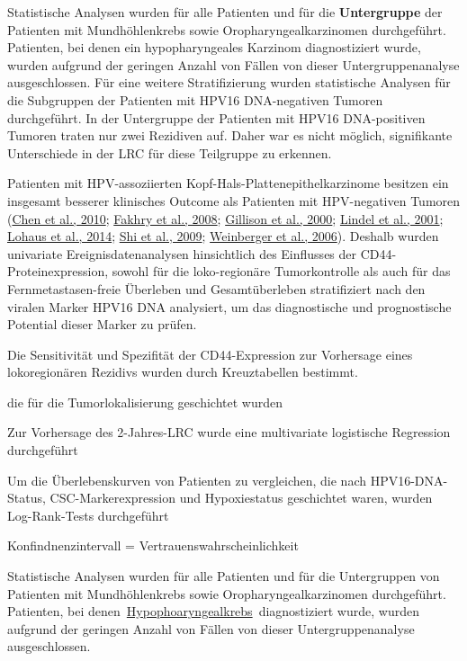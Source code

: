 Statistische Analysen wurden für alle Patienten und für die \textbf{Untergruppe} der Patienten mit Mundhöhlenkrebs sowie Oropharyngealkarzinomen durchgeführt. Patienten, bei denen ein hypopharyngeales Karzinom diagnostiziert wurde, wurden aufgrund der geringen Anzahl von Fällen von dieser Untergruppenanalyse ausgeschlossen. Für eine weitere Stratifizierung wurden statistische Analysen für die Subgruppen der Patienten mit HPV16 DNA-negativen Tumoren durchgeführt. In der Untergruppe der Patienten mit HPV16 DNA-positiven Tumoren traten nur zwei Rezidiven auf. Daher war es nicht möglich, signifikante Unterschiede in der LRC für diese Teilgruppe zu erkennen.

Patienten mit HPV-assoziierten Kopf-Hals-Plattenepithelkarzinome besitzen ein insgesamt besserer klinisches Outcome als Patienten mit HPV-negativen Tumoren (\href{about:blank\#_ENREF_21}{Chen et al., 2010}; \href{about:blank\#_ENREF_32}{Fakhry et al., 2008}; \href{about:blank\#_ENREF_35}{Gillison et al., 2000}; \href{about:blank\#_ENREF_49}{Lindel et al., 2001}; \href{about:blank\#_ENREF_52}{Lohaus et al., 2014}; \href{about:blank\#_ENREF_65}{Shi et al., 2009}; \href{about:blank\#_ENREF_75}{Weinberger et al., 2006}). Deshalb wurden univariate Ereignisdatenanalysen hinsichtlich des Einflusses der CD44-Proteinexpression, sowohl für die loko-regionäre Tumorkontrolle als auch für das Fernmetastasen-freie Überleben und Gesamtüberleben stratifiziert nach den viralen Marker HPV16 DNA analysiert, um das diagnostische und prognostische Potential dieser Marker zu prüfen.

Die Sensitivität und Spezifität der CD44-Expression zur Vorhersage eines lokoregionären Rezidivs wurden durch Kreuztabellen bestimmt.

die für die Tumorlokalisierung geschichtet wurden

Zur Vorhersage des 2-Jahres-LRC wurde eine multivariate logistische Regression durchgeführt

Um die Überlebenskurven von Patienten zu vergleichen, die nach HPV16-DNA-Status, CSC-Markerexpression und Hypoxiestatus geschichtet waren, wurden Log-Rank-Tests durchgeführt

Konfindnenzintervall = Vertrauenswahrscheinlichkeit

Statistische Analysen wurden für alle Patienten und für die Untergruppen von Patienten mit Mundhöhlenkrebs sowie Oropharyngealkarzinomen durchgeführt. Patienten, bei denen~\href{https://www.sciencedirect.com/topics/medicine-and-dentistry/hypopharyngeal-cancer}{Hypophoaryngealkrebs}~diagnostiziert wurde, wurden aufgrund der geringen Anzahl von Fällen von dieser Untergruppenanalyse ausgeschlossen.

